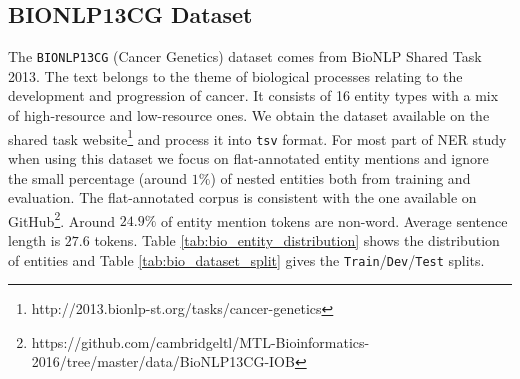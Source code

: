 \subsection{BIONLP13CG Dataset}

The \texttt{BIONLP13CG}\cite{pyysalo2015overview} (Cancer Genetics) dataset comes from BioNLP Shared Task 2013. The text belongs to the theme of biological processes relating to the development and progression of cancer. It consists of 16 entity types with a mix of high-resource and low-resource ones. We obtain the dataset available on the shared task website\footnote{http://2013.bionlp-st.org/tasks/cancer-genetics} and process it into \texttt{tsv} format. For most part of NER study when using this dataset we focus on flat-annotated entity mentions and ignore the small percentage (around $1\%$) of nested entities both from training and evaluation. The flat-annotated corpus is consistent with the one available on GitHub\footnote{https://github.com/cambridgeltl/MTL-Bioinformatics-2016/tree/master/data/BioNLP13CG-IOB}. Around $24.9\%$ of entity mention tokens are non-word. Average sentence length is $27.6$ tokens. Table \ref{tab:bio_entity_distribution} shows the distribution of entities and Table \ref{tab:bio_dataset_split} gives the \texttt{Train}/\texttt{Dev}/\texttt{Test} splits. 


